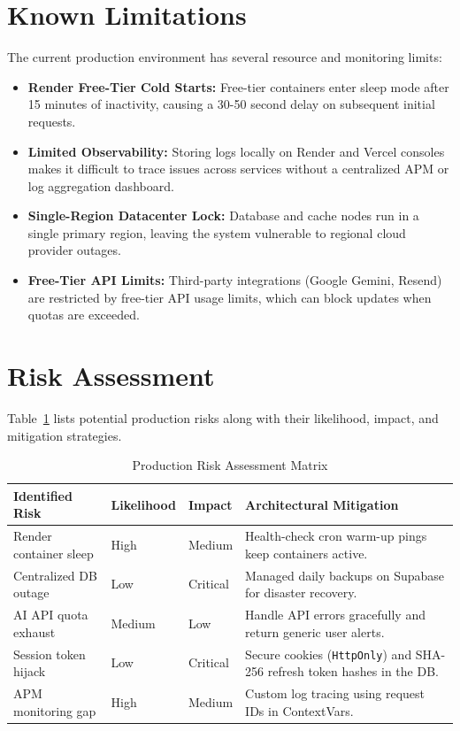 \section{Known Limitations}
The current production environment has several resource and monitoring limits:
\begin{itemize}
    \item \textbf{Render Free-Tier Cold Starts:} Free-tier containers enter sleep mode after 15 minutes of inactivity, causing a 30-50 second delay on subsequent initial requests.
    \item \textbf{Limited Observability:} Storing logs locally on Render and Vercel consoles makes it difficult to trace issues across services without a centralized APM or log aggregation dashboard.
    \item \textbf{Single-Region Datacenter Lock:} Database and cache nodes run in a single primary region, leaving the system vulnerable to regional cloud provider outages.
    \item \textbf{Free-Tier API Limits:} Third-party integrations (Google Gemini, Resend) are restricted by free-tier API usage limits, which can block updates when quotas are exceeded.
\end{itemize}

\section{Risk Assessment}
Table~\ref{tab:risk_assessment} lists potential production risks along with their likelihood, impact, and mitigation strategies.

\begin{table}[h!]
\centering
\small
\renewcommand{\arraystretch}{1.4}
\begin{tabularx}{\textwidth}{l l l X}
    \toprule[1.5pt]
    \rowcolor{primary!5}
    \textbf{\color{primary}Identified Risk} & \textbf{\color{primary}Likelihood} & \textbf{\color{primary}Impact} & \textbf{\color{primary}Architectural Mitigation} \\
    \midrule
    Render container sleep & High & Medium & Health-check cron warm-up pings keep containers active. \\
    Centralized DB outage & Low & Critical & Managed daily backups on Supabase for disaster recovery. \\
    AI API quota exhaust & Medium & Low & Handle API errors gracefully and return generic user alerts. \\
    Session token hijack & Low & Critical & Secure cookies (\texttt{HttpOnly}) and SHA-256 refresh token hashes in the DB. \\
    APM monitoring gap & High & Medium & Custom log tracing using request IDs in ContextVars. \\
    \bottomrule[1.5pt]
\end{tabularx}
\caption{Production Risk Assessment Matrix}
\label{tab:risk_assessment}
\end{table}

